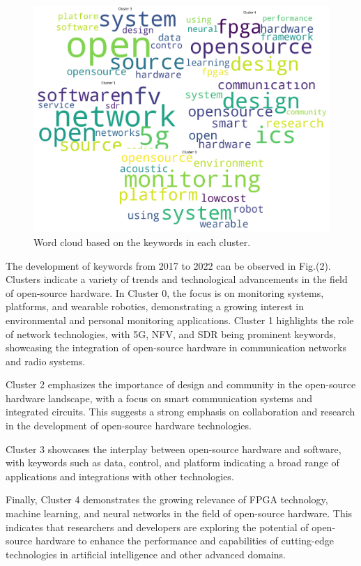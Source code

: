 \documentclass[final-report.tex]{subfiles}
\begin{document}
\begin{figure}[!h]
    \begin{minipage}{0.5\textwidth}
        \centering
        \includegraphics[width=\textwidth]{../Images/wordcloud.png}
        \caption{Word cloud based on the keywords in each cluster.}
        \label{fig:1}
    \end{minipage}
\end{figure}
The development of keywords from 2017 to 2022 can be observed in Fig.(2). Clusters indicate a variety of trends and technological advancements in the field of open-source hardware. In Cluster 0, the focus is on monitoring systems, platforms, and wearable robotics, demonstrating a growing interest in environmental and personal monitoring applications. Cluster 1 highlights the role of network technologies, with 5G, NFV, and SDR being prominent keywords, showcasing the integration of open-source hardware in communication networks and radio systems.

Cluster 2 emphasizes the importance of design and community in the open-source hardware landscape, with a focus on smart communication systems and integrated circuits. This suggests a strong emphasis on collaboration and research in the development of open-source hardware technologies. 

Cluster 3 showcases the interplay between open-source hardware and software, with keywords such as data, control, and platform indicating a broad range of applications and integrations with other technologies.

Finally, Cluster 4 demonstrates the growing relevance of FPGA technology, machine learning, and neural networks in the field of open-source hardware. This indicates that researchers and developers are exploring the potential of open-source hardware to enhance the performance and capabilities of cutting-edge technologies in artificial intelligence and other advanced domains.
\end{document}
